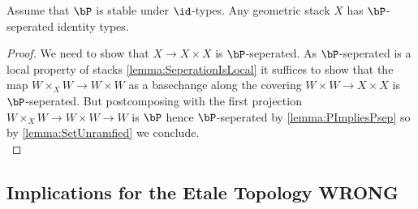 %		

\begin{lemma}{\label{old}}
	Assume that $\bP$ is stable under $\id$-types. Any geometric stack $X$ has $\bP$-seperated identity types. \\
\end{lemma}
\begin{proof}
	We need to show that $X \to X \times X$ is $\bP$-seperated. As $\bP$-seperated is a local property of stacks \ref{lemma:SeperationIsLocal} it suffices to show that the map $W \times_X W \to W \times W$ as a basechange along the covering $W \times W \to X \times X$ is $\bP$-seperated. But postcomposing with the first projection $W \times_X W \to W \times W \to W$ is $\bP$ hence $\bP$-seperated by \ref{lemma:PImpliesPsep} so by \ref{lemma:SetUnramfied} we conclude. \\
\end{proof}
\subsection{Implications for the Etale Topology WRONG}

